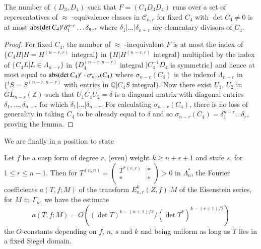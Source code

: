 \begin{sublemma}\label{c1:lem-1.6.22}
The number of $(D_{3},D_{4})$ such that $F=(C_{4}D_{3}D_{4})$ runs
over a set of representatives of $\approx$ -equivalence classes in
$\mathscr{C}_{n,r}$ for fixed $C_{4}$ with $\det C_{4}\neq 0$ is at
most $\operatorname{abs}(\det C_{4})^{r}\delta^{n-r}_{1}\ldots\delta_{n-r}$ where
$\delta_{1}|\ldots|\delta_{n-r}$ are elementary divisors of $C_{4}$.
\end{sublemma}

\begin{proof}
For fixed $C_{4}$, the number of $\approx$ -inequivalent $F$ is at
most the index of $\{C_{4}H|H=H^{(n-r,r)}$ integral$\}$ in
$\{H|H^{(n-r,r)}$ integral$\}$ multiplied by the index of
$\{C_{4}L|L\in\Lambda_{n-r}\}$ in $\{D_{4}^{(n-r,n-r)}$ integral
$|C^{-1}_{4}D_{4}$ is symmetric$\}$ and hence at most equal to
$\operatorname{abs}(\det C_{4})^{r}\cdot \sigma_{n-r}(C_{4})$ where
$\sigma_{n-r}(C_{4})$ is the index\pageoriginale of $\Lambda_{n-r}$ in
$\{{}^{t}S=S^{(n-r,n-r)}$ with entries in $\mathbb{Q}|C_{4}S$
integral$\}$. Now there exist $U_{1}$, $U_{2}$ in
$GL_{n-r}(\mathbb{Z})$ such that $U_{1}C_{4}U_{2}=\delta$ is a
diagonal matrix with diagonal entries $\delta_{1},\ldots,\delta_{n-r}$
for which $\delta_{1}|\ldots|\delta_{n-r}$. For calculating
$\sigma_{n-r}(C_{4})$, there is no loss of generality in taking
$C_{4}$ to be already equal to $\delta$ and so
$\sigma_{n-r}(C_{4})=\delta^{n-r}_{1}\ldots \delta_{r}$, proving the
lemma.
\end{proof}

We are finally in a position to state 

\setcounter{subtheorem}{22}
\begin{subtheorem}\label{c1:thm-1.6.23}
Let $f$ be a cusp form of degree $r$, (even) weight $k\geq n+r+1$ and
stufe $s$, for $1\leq r\leq n-1$. Then for
$T^{(n,n)}=\left(\begin{smallmatrix} T^{\ast(r,r)} & \ast\\ \ast &
  \ast
\end{smallmatrix}\right)>0$ in $\Lambda^{\ast}_{n}$, the Fourier
coefficients $a(T,f;M)$ of the transform $E^{k}_{n,r}(Z,f)|M$ of the
Eisenstein series, for $M$ in $\Gamma_{n}$, we have the estimate
$$
a(T,f;M)=O((\det T)^{k-(n+1)/2}/(\det T^{\ast})^{k-(r+1)/2})
$$
the $O$-constants depending on $f$, $n$, $s$ and $k$ and being uniform
as long as $T$ lies in a fixed Siegel domain.
\end{subtheorem}

